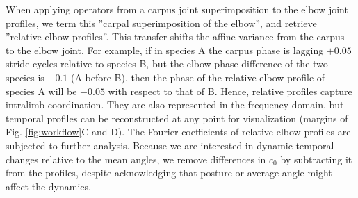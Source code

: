 When applying operators from a carpus joint superimposition to the elbow joint profiles, we term this ''carpal superimposition of the elbow'', and retrieve ''relative elbow profiles''.
This transfer shifts the affine variance from the carpus to the elbow joint.
For example, if in species A the carpus phase is lagging $+0.05$ stride cycles relative to species B, but the elbow phase difference of the two species is $-0.1$ (A before B), then the phase of the relative elbow profile of species A will be $-0.05$ with respect to that of B.
Hence, relative profiles capture intralimb coordination.
They are also represented in the frequency domain, but temporal profiles can be reconstructed at any point for visualization  (margins of Fig. \ref{fig:workflow}C and D).
The Fourier coefficients of relative elbow profiles are subjected to further analysis.
Because we are interested in dynamic temporal changes relative to the mean angles, we remove differences in $c_0$ by subtracting it from the profiles, despite acknowledging that posture or average angle might affect the dynamics.

